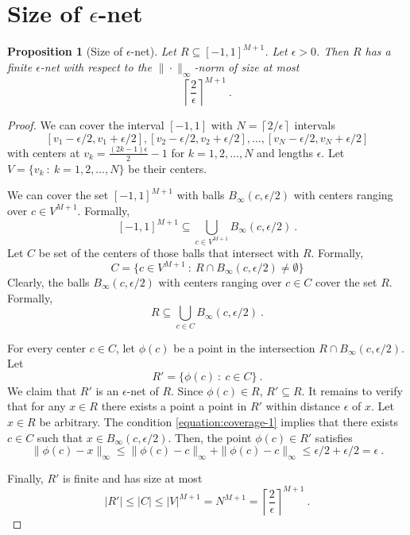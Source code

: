 \documentclass[12pt]{article}
\newtheorem{proposition}[theorem]{Proposition}
\theoremstyle{definition}
\begin{document}
\section{Size of $\epsilon$-net}
\label{section:size-of-epsilon-net}

\begin{proposition}[Size of $\epsilon$-net]
\label{proposition:size-of-epsilon-net}
Let $R \subseteq [-1,1]^{M+1}$. Let $\epsilon > 0$.
Then $R$ has a finite $\epsilon$-net with respect to the $\|\cdot\|_\infty$-norm of size at most
$$
\left\lceil \frac{2}{\epsilon} \right\rceil^{M+1} \: .
$$
\end{proposition}

\begin{proof}
We can cover the interval $[-1,1]$ with $N = \left\lceil 2/\epsilon \right\rceil$ intervals
$$
[v_1 - \epsilon/2, v_1 + \epsilon/2], [v_2 - \epsilon/2, v_2 + \epsilon/2], \dots, [v_N - \epsilon/2, v_N + \epsilon/2]
$$
with centers at $v_k = \frac{(2k-1)\epsilon}{2}  - 1$ for $k = 1, 2, \dots, N$
and lengths $\epsilon$. Let $V = \{v_k ~:~ k = 1, 2, \dots, N\}$ be their
centers.

We can cover the set $[-1,1]^{M+1}$ with balls $B_\infty(c, \epsilon/2)$ with
centers ranging over $c \in V^{M+1}$. Formally,
$$
[-1,1]^{M+1} \subseteq \bigcup_{c \in V^{M+1}} B_\infty(c,\epsilon/2) \: .
$$
Let $C$ be set of the centers of those balls that intersect with $R$.
Formally,
$$
C = \{ c \in V^{M+1} ~:~ R \cap B_\infty(c,\epsilon/2) \neq \emptyset \}
$$
Clearly, the balls $B_\infty(c, \epsilon/2)$ with centers ranging over $c \in C$ cover the set $R$. Formally,
\begin{equation}
\label{equation:coverage-1}
R \subseteq \bigcup_{c \in C} B_\infty(c,\epsilon/2) \: .
\end{equation}

For every center $c \in C$, let $\phi(c)$ be a point in the intersection $R \cap
B_\infty(c,\epsilon/2)$. Let
$$
R' = \{\phi(c) ~:~ c \in C\} \: .
$$
We claim that $R'$ is an $\epsilon$-net of $R$. Since $\phi(c) \in R$, $R'
\subseteq R$. It remains to verify that for any $x \in R$ there exists a point a
point in $R'$ within distance $\epsilon$ of $x$. Let $x \in R$ be arbitrary.
The condition \eqref{equation:coverage-1} implies that there exists $c \in C$
such that $x \in B_\infty(c,\epsilon/2)$. Then, the point $\phi(c) \in R'$
satisfies
$$
\|\phi(c) - x\|_\infty \le \|\phi(c) - c\|_\infty + \|\phi(c) - c\|_\infty \le \epsilon/2 + \epsilon/2 = \epsilon \: .
$$

Finally, $R'$ is finite and has size at most
$$
|R'| \le |C| \le |V|^{M+1} = N^{M+1} = \left\lceil \frac{2}{\epsilon} \right\rceil^{M+1} \: .
$$
\end{proof}

\nocite{*}


\end{document}
